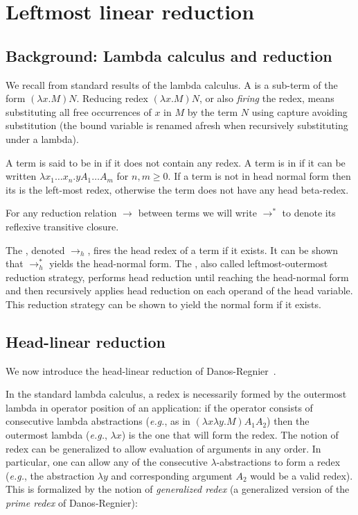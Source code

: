 \documentclass{article}
\makeatletter
\theoremstyle{definition}
\renewcommand\eg{{\it e.g.\@\xspace}}
\makeatother
\begin{document}

\section{Leftmost linear reduction}
\label{sec:leftmostlinearred}

\subsection{Background: Lambda calculus and reduction}
We recall from standard results of the lambda calculus.
A  is a sub-term of the form $(\lambda x. M) N$.
Reducing redex $(\lambda x. M) N$, or also \emph{firing} the redex, means substituting all free occurrences of $x$ in $M$ by the term $N$ using capture avoiding substitution (the bound variable is renamed afresh when recursively substituting under a lambda).

A term is said to be in  if it does not contain any redex.
A term is in  if it can be written $\lambda x_1 \ldots x_n . y A_1 \ldots A_m$ for $n,m\geq0$. If a term is not in head normal form then its  is the left-most redex, otherwise the term does not have any head beta-redex.

For any reduction relation $\rightarrow$ between terms we will write
$\rightarrow^*$ to denote its reflexive transitive closure.

The , denoted $\rightarrow_{h}$, fires the head redex of a term if it exists. It can be shown that $\rightarrow^*_{h}$ yields the head-normal form. The , also called leftmost-outermost reduction strategy, performs head reduction until reaching the head-normal form and then recursively applies head reduction on each operand of the head variable. This reduction strategy can be shown to yield the normal form if it exists.


\subsection{Head-linear reduction}
We now introduce the head-linear reduction of Danos-Regnier~\cite{danos-head}.

In the standard lambda calculus, a redex is necessarily formed by the outermost lambda in operator position of an application: if the operator consists of consecutive lambda abstractions (\eg, as in $(\lambda x \lambda y . M) A_1 A_2$) then the outermost lambda (\eg, $\lambda x$) is the one that will form the redex. The notion of redex can be generalized to allow evaluation of arguments in any order. In particular, one can allow any of the consecutive $\lambda$-abstractions to form a redex (\eg, the abstraction $\lambda y$ and corresponding argument $A_2$ would be a valid redex). This is formalized by the notion of \emph{generalized redex} (a generalized version of the \emph{prime redex} of Danos-Regnier):
\end{document}
